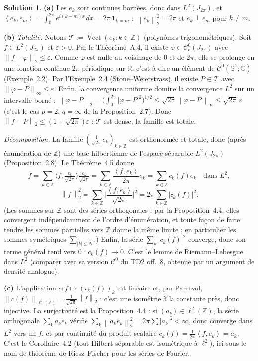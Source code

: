 \documentclass[11pt,a4paper]{article}
\newcommand{\R}{\mathbb{R}}
\newcommand{\Z}{\mathbb{Z}}
\newcommand{\C}{\mathbb{C}}
\newcommand{\Vect}{\operatorname{Vect}}
\newcommand{\norm}[1]{\left\|#1\right\|}
\newcommand{\Cz}{\mathcal{C}^0}
\newcommand{\Cc}{\mathcal{C}^0_c}
\newcommand{\ie}{c'est-à-dire}
\newcommand{\Sun}{\mathbb{S}^1}
\newcommand{\ps}[2]{\left\langle #1,#2\right\rangle}
\theoremstyle{definition}
\newtheorem*{solution}{Solution}
\begin{document}
\begin{solution}
\noindent\textbf{(a)} Les $e_k$ sont continues bornées, donc dans $L^2(J_{2\pi})$, et $\ps{e_k}{e_m}=\int_0^{2\pi}e^{i(k-m)x}\,dx=2\pi\,\mathbf 1_{k=m}$ : $\norm{e_k}_2^2=2\pi$ et $e_k\perp e_m$ pour $k\ne m$.

\medskip
\noindent\textbf{(b)} \emph{Totalité.} Notons $\mathcal T:=\Vect(e_k:k\in\Z)$ (polynômes trigonométriques). Soit $f\in L^2(J_{2\pi})$ et $\varepsilon>0$. Par le Théorème~A.4, il existe $\varphi\in\Cc(J_{2\pi})$ avec $\norm{f-\varphi}_2\le\varepsilon$. Comme $\varphi$ est nulle au voisinage de $0$ et de $2\pi$, elle se prolonge en une fonction continue $2\pi$-périodique sur $\R$, \ie{} un élément de $\Cz(\Sun;\C)$ (Exemple~2.2). Par l'Exemple~2.4 (Stone--Weierstrass), il existe $P\in\mathcal T$ avec $\norm{\varphi-P}_\infty\le\varepsilon$. Enfin, la convergence uniforme domine la convergence $L^2$ sur un intervalle borné : $\norm{\varphi-P}_2=\big(\int_0^{2\pi}|\varphi-P|^2\big)^{1/2}\le\sqrt{2\pi}\norm{\varphi-P}_\infty\le\sqrt{2\pi}\,\varepsilon$ (c'est le cas $p=2$, $q=\infty$ de la Proposition~2.7). Donc $\norm{f-P}_2\le(1+\sqrt{2\pi})\varepsilon$ : $\mathcal T$ est dense, la famille est totale.

\emph{Décomposition.} La famille $(\tfrac1{\sqrt{2\pi}}e_k)_{k\in\Z}$ est orthonormée et totale, donc (après énumération de $\Z$) une base hilbertienne de l'espace séparable $L^2(J_{2\pi})$ (Proposition~2.8). Le Théorème~4.5 donne
\[
f=\sum_{k\in\Z}\Big\langle f,\tfrac{e_k}{\sqrt{2\pi}}\Big\rangle\tfrac{e_k}{\sqrt{2\pi}}=\sum_{k\in\Z}\frac{\ps f{e_k}}{2\pi}e_k=\sum_{k\in\Z}c_k(f)e_k
\quad\text{dans }L^2,
\]
\[
\norm f_2^2=\sum_{k\in\Z}\Big|\frac{\ps f{e_k}}{\sqrt{2\pi}}\Big|^2=2\pi\sum_{k\in\Z}|c_k(f)|^2 .
\]
(Les sommes sur $\Z$ sont des séries orthogonales : par la Proposition~4.4, elles convergent indépendamment de l'ordre d'énumération, et toute façon de faire tendre les sommes partielles vers $\Z$ donne la même limite ; en particulier les sommes symétriques $\sum_{|k|\le N}$.) Enfin, la série $\sum_k|c_k(f)|^2$ converge, donc son terme général tend vers $0$ : $c_k(f)\to0$. C'est le lemme de Riemann--Lebesgue dans $L^2$ (comparer avec sa version $\Cz$ du TD2 off.~8, obtenue par un argument de densité analogue).

\medskip
\noindent\textbf{(c)} L'application $c:f\mapsto(c_k(f))_k$ est linéaire et, par Parseval, $\norm{c(f)}_{\ell^2(\Z)}=\frac1{\sqrt{2\pi}}\norm f_2$ : c'est une isométrie à la constante près, donc injective. La surjectivité est la Proposition~4.4 : si $(a_k)\in\ell^2(\Z)$, la série orthogonale $\sum_ka_ke_k$ vérifie $\sum_k\norm{a_ke_k}_2^2=2\pi\sum|a_k|^2<\infty$, donc converge dans $L^2$ vers un $f$, et par continuité du produit scalaire $c_k(f)=\frac1{2\pi}\ps f{e_k}=a_k$. C'est le Corollaire~4.2 (tout Hilbert séparable est isométrique à $\ell^2$), ici sous le nom de théorème de Riesz--Fischer pour les séries de Fourier.


\end{solution}
\end{document}
